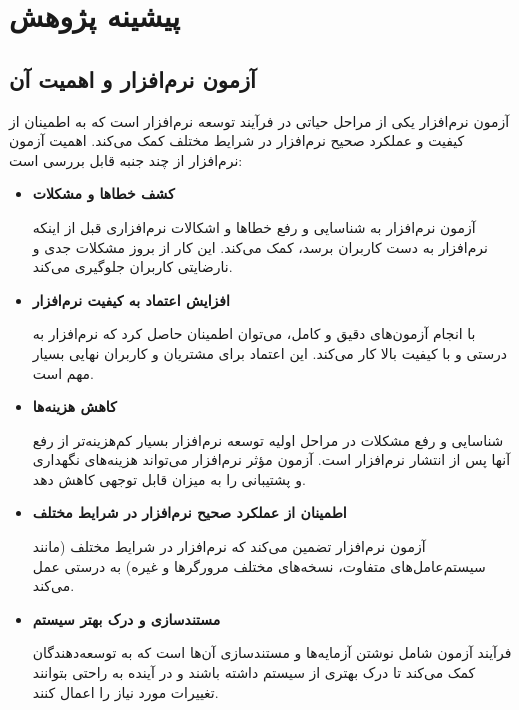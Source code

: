 \chapter{پیشینه پژوهش}\label{chapter2}
\section{آزمون نرم‌افزار و اهمیت آن}

آزمون نرم‌افزار یکی از مراحل حیاتی در فرآیند توسعه نرم‌افزار است که به اطمینان از کیفیت و عملکرد صحیح نرم‌افزار در شرایط مختلف کمک می‌کند. اهمیت آزمون نرم‌افزار از چند جنبه قابل بررسی است:

\begin{itemize}
	\item \textbf{کشف خطا‌ها و مشکلات}
	
	 آزمون نرم‌افزار به شناسایی و رفع خطاها و اشکالات نرم‌افزاری قبل از اینکه نرم‌افزار به دست کاربران برسد، کمک می‌کند. این کار از بروز مشکلات جدی و نارضایتی کاربران جلوگیری می‌کند.
	\item \textbf{افزایش اعتماد به کیفیت نرم‌افزار}
	
	 با انجام آزمون‌های دقیق و کامل، می‌توان اطمینان حاصل کرد که نرم‌افزار به درستی و با کیفیت بالا کار می‌کند. این اعتماد برای مشتریان و کاربران نهایی بسیار مهم است.
	\item \textbf{کاهش هزینه‌ها}
	
	 شناسایی و رفع مشکلات در مراحل اولیه توسعه نرم‌افزار بسیار کم‌هزینه‌تر از رفع آنها پس از انتشار نرم‌افزار است. آزمون مؤثر نرم‌افزار می‌تواند هزینه‌های نگهداری و پشتیبانی را به میزان قابل توجهی کاهش دهد.
	\item \textbf{اطمینان از عملکرد صحیح نرم‌افزار در شرایط مختلف}
	
	 آزمون نرم‌افزار تضمین می‌کند که نرم‌افزار در شرایط مختلف (مانند سیستم‌عامل‌های متفاوت، نسخه‌های مختلف مرورگرها و غیره) به درستی عمل می‌کند.
	\item \textbf{مستندسازی و درک بهتر سیستم}
	
	 فرآیند آزمون شامل نوشتن آزمایه‌ها و مستندسازی آن‌ها است که به توسعه‌دهندگان کمک می‌کند تا درک بهتری از سیستم داشته باشند و در آینده به راحتی بتوانند تغییرات مورد نیاز را اعمال کنند.
\end{itemize}

